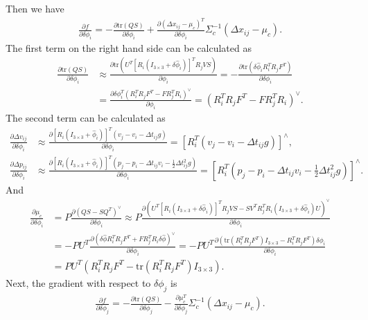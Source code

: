 \documentclass[10pt]{article}
\newcommand{\tr}[1]{\ensuremath{\mathrm{tr}\left( #1 \right)}}
\begin{document}
Then we have
\color{blue}
\begin{align}
	\frac{\partial f}{\partial \delta \phi_i} = -\frac{\partial \tr{QS}}{\partial \delta \phi_i} + \frac{\partial (\Delta x_{ij} - \mu_c)^T}{\partial \delta \phi_i} \Sigma_c^{-1} (\Delta x_{ij} - \mu_c).
\end{align}
\color{black}
The first term on the right hand side can be calculated as
\begin{align}
	\frac{\partial \tr{QS}}{\partial \delta \phi_i} &\approx \frac{\partial \tr{U^T[R_i(I_{3\times 3} + \delta \hat{\phi}_i)]^TR_jVS}}{\partial \phi_i}
	= -\frac{\partial \tr{\delta\hat{\phi}_i R_i^TR_jF^T}}{\partial \delta\phi_i} \nonumber \\
	&= \frac{\partial \delta\phi_i^T (R_i^TR_jF^T - FR_j^TR_i)^\vee}{\partial \phi_i} = (R_i^TR_jF^T - FR_j^TR_i)^\vee.
\end{align}
The second term can be calculated as
\begin{align}
	\frac{\partial \Delta v_{ij}}{\partial \delta\phi_i} &\approx \frac{\partial [R_i(I_{3\times 3} + \hat{\phi}_i)]^T (v_j-v_i-\Delta t_{ij}g)}{\partial \delta\phi_i} = \left[ R_i^T(v_j-v_i-\Delta t_{ij}g) \right]^\wedge, \\
	\frac{\partial \Delta p_{ij}}{\partial \delta\phi_i} &\approx \frac{\partial [R_i(I_{3\times 3} + \hat{\phi}_i)]^T (p_j-p_i-\Delta t_{ij}v_i - \tfrac{1}{2}\Delta t_{ij}^2g)}{\partial \delta\phi_i} = \left[ R_i^T(p_j-p_i-\Delta t_{ij}v_i - \tfrac{1}{2}\Delta t_{ij}^2g) \right]^\wedge.
\end{align}
And
\begin{align}
	\frac{\partial \mu_c}{\partial \delta\phi_i} &= P \frac{\partial (QS-SQ^T)^\vee}{\partial \delta\phi_i} \approx P \frac{\partial \left(U^T[R_i(I_{3\times 3}+\delta\hat{\phi}_i)]^TR_jVS - SV^TR_j^TR_i(I_{3\times 3}+\delta\hat{\phi}_i)U\right)^\vee}{\partial \delta\phi_i} \nonumber \\
	&= -PU^T \frac{\partial \left(\delta\hat{\phi}R_i^TR_jF^T + FR_j^TR_i\delta\hat{\phi}\right)^\vee}{\partial \delta\phi_i} = -PU^T \frac{\partial \left(\tr{R_i^TR_jF^T}I_{3\times 3} - R_i^TR_jF^T\right) \delta\phi_i}{\partial \delta\phi_i} \nonumber \\
	&= PU^T\left(R_i^TR_jF^T - \tr{R_i^TR_jF^T}I_{3\times 3}\right).
\end{align}
Next, the gradient with respect to $\delta\phi_j$ is
\color{blue}
\begin{align}
	\frac{\partial f}{\partial \delta\phi_j} = -\frac{\partial \tr{QS}}{\partial \delta \phi_j} - \frac{\partial \mu_c^T}{\partial \delta\phi_j} \Sigma_c^{-1} (\Delta x_{ij} - \mu_c).
\end{align}
\end{document}
